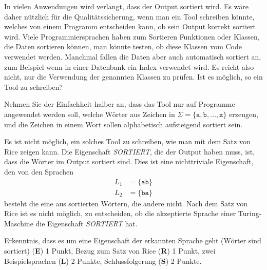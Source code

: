 In vielen Anwendungen wird verlangt, dass der Output sortiert wird.
Es wäre daher nützlich für die Qualitätssicherung, wenn man ein Tool
schreiben könnte, welches von einem Programm entscheiden kann,
ob sein Output korrekt sortiert wird.
Viele Programmiersprachen haben zum Sortieren Funktionen oder Klassen,
die Daten sortieren können, man könnte testen, ob diese Klassen vom
Code verwendet werden.
Manchmal fallen die Daten aber auch automatisch sortiert an, zum
Beispiel wenn in einer Datenbank ein Index verwendet wird.
Es reicht also nicht, nur die Verwendung der genannten Klassen zu
prüfen.
Ist es möglich, so ein Tool zu schreiben?

Nehmen Sie der Einfachheit halber an, dass das Tool nur auf Programme
angewendet werden soll, welche Wörter aus Zeichen in
$\Sigma=\{\texttt{a},\texttt{b},\dots,\texttt{z}\}$ erzeugen, und
die Zeichen in einem Wort sollen alphabetisch aufsteigend sortiert sein.


\begin{loesung}
Es ist nicht möglich, ein solches Tool zu schreiben, wie man mit dem
Satz von Rice zeigen kann.
Die Eigenschaft \textsl{SORTIERT}, die der Output haben muss, ist,
dass die Wörter im Output sortiert sind.
Dies ist eine nichttriviale Eigenschaft, den von den Sprachen
\begin{align*}
L_1&=\{ \texttt{ab} \}\\
L_2&=\{ \texttt{ba} \}
\end{align*}
besteht die eine aus sortierten Wörtern, die andere nicht. 
Nach dem Satz von Rice ist es nicht möglich, zu entscheiden, ob die
akzeptierte Sprache einer Turing-Maschine die Eigenschaft \textsl{SORTIERT}
hat.
\end{loesung}

\begin{bewertung}
Erkenntnis, dass es um eine Eigenschaft der erkannten Sprache geht
(Wörter sind sortiert) ({\bf E}) 1 Punkt,
Bezug zum Satz von Rice ({\bf R}) 1 Punkt,
zwei Beispielsprachen ({\bf L}) 2 Punkte,
Schlussfolgerung ({\bf S}) 2 Punkte.
\end{bewertung}

